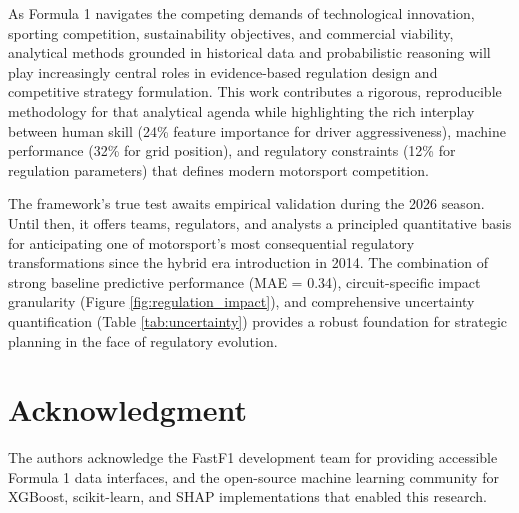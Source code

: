 \documentclass[conference]{IEEEtran}
\begin{document}
As Formula 1 navigates the competing demands of technological innovation, sporting competition, sustainability objectives, and commercial viability, analytical methods grounded in historical data and probabilistic reasoning will play increasingly central roles in evidence-based regulation design and competitive strategy formulation. This work contributes a rigorous, reproducible methodology for that analytical agenda while highlighting the rich interplay between human skill (24\% feature importance for driver aggressiveness), machine performance (32\% for grid position), and regulatory constraints (12\% for regulation parameters) that defines modern motorsport competition.

The framework's true test awaits empirical validation during the 2026 season. Until then, it offers teams, regulators, and analysts a principled quantitative basis for anticipating one of motorsport's most consequential regulatory transformations since the hybrid era introduction in 2014. The combination of strong baseline predictive performance (MAE = 0.34), circuit-specific impact granularity (Figure \ref{fig:regulation_impact}), and comprehensive uncertainty quantification (Table \ref{tab:uncertainty}) provides a robust foundation for strategic planning in the face of regulatory evolution.

\section*{Acknowledgment}

The authors acknowledge the FastF1 development team for providing accessible Formula 1 data interfaces, and the open-source machine learning community for XGBoost, scikit-learn, and SHAP implementations that enabled this research.
\end{document}

